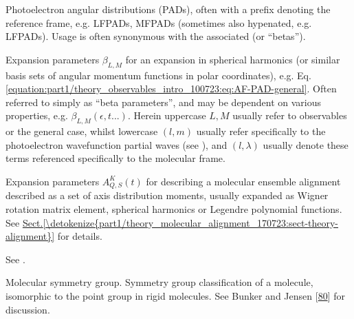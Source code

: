 \documentclass[letterpaper,table,10pt,english]{jupyterBook}
\begin{document}
\begin{description}
\sphinxAtStartPar
Photoelectron angular distributions (PADs), often with a prefix denoting the reference frame, e.g. LFPADs, MFPADs (sometimes also hypenated, e.g. LF\sphinxhyphen{}PADs). Usage is often synonymous with the associated {\hyperref[\detokenize{backmatter/glossary:term-anisotropy-paramters}]{}} (or “betas”).

\sphinxAtStartPar
Expansion parameters \(\beta_{L,M}\) for an expansion in spherical harmonics (or similar basis sets of angular momentum functions in polar coordinates), e.g. Eq. \eqref{equation:part1/theory_observables_intro_100723:eq:AF-PAD-general}. Often referred to simply as “beta parameters”, and may be dependent on various properties, e.g. \(\beta_{L,M}(\epsilon,t...)\). Herein upper\sphinxhyphen{}case \(L,M\) usually refer to observables or the general case, whilst lower\sphinxhyphen{}case \((l,m)\) usually refer specifically to the photoelectron wavefunction partial waves (see ), and \((l,\lambda)\) usually denote these terms referenced specifically to the molecular frame.

\sphinxAtStartPar
Expansion parameters \(A_{Q,S}^{K}(t)\) for describing a molecular ensemble alignment described as a set of axis distribution moments, usually expanded as Wigner rotation matrix element, spherical harmonics or Legendre polynomial functions. See \hyperref[\detokenize{part1/theory_molecular_alignment_170723:sect-theory-alignment}]{Sect.\@ \ref{\detokenize{part1/theory_molecular_alignment_170723:sect-theory-alignment}}} for details.

\sphinxAtStartPar
See {\hyperref[\detokenize{backmatter/glossary:term-ADMs}]{}}.

\sphinxAtStartPar
Molecular symmetry group. Symmetry group classification of a molecule, isomorphic to the point group in rigid molecules. See Bunker and Jensen {[}\hyperlink{cite.backmatter/bibliography:id538}{80}{]} for discussion.


\end{description}
\end{document}

